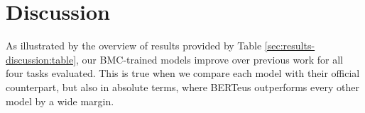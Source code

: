 \documentclass[10pt, a4paper]{article}
\begin{document}

\begin{table*}[!t]
\centering
{}
\caption{An example from the EIEC corpus where the mBERT model misses to disambiguate the cases of metonymy. The translation of the sentence is the following: \textit{On that issue about Chechenya the support given by the United States and Western Europe has been visible.}}
\label{tab:ner-examples}
\end{table*}


\section{Discussion}\label{sec:discussion}

As illustrated by the overview of results provided by Table \ref{sec:results-discussion:table}, our BMC-trained models improve over previous work for all four tasks evaluated. This is true when we compare each model with their official counterpart, but also in absolute terms, where BERTeus outperforms every other model by a wide margin.
\end{document}

